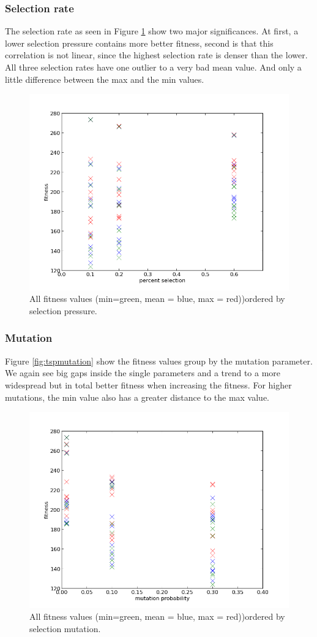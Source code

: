 \documentclass{scrartcl}
\begin{document}
\subsubsection{Selection rate} 
The selection rate as seen in Figure \ref{fig:tspselect} show two major significances. At first, a lower selection pressure contains more better fitness, second is that this correlation is not linear, since the highest selection rate is denser than the lower.\\
All three selection rates have one outlier to a very bad mean value. And only a little difference between the max and the min values.

\begin{figure}
 \center
 \includegraphics[width=.5\linewidth]{img/ex3/tsp_fitness_selection.png}
 \caption{All fitness values (min=green, mean = blue, max = red))ordered by selection pressure.}
 \label{fig:tspselect}
\end{figure}


\subsubsection{Mutation}
Figure \ref{fig:tspmutation} show the fitness values group by the mutation parameter. We again see big gaps inside the single parameters and a trend to a more widespread but in total better fitness when increasing the fitness. For higher mutations, the min value also has a greater distance to the max value.

\begin{figure}
 \center
 \includegraphics[width=.5\linewidth]{img/ex3/tsp_fitness_mutation.png}
 \caption{All fitness values (min=green, mean = blue, max = red))ordered by selection mutation.}
 \label{fig:tspmutate}
\end{figure}
\end{document}
